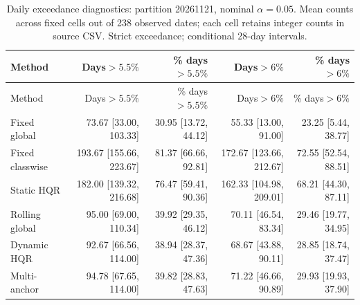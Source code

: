 \begingroup\small\setlength{\tabcolsep}{3pt}
\begin{longtable}{lrrrr}
\caption{Daily exceedance diagnostics: partition 20261121, nominal $\alpha=0.05$. Mean counts across fixed cells out of 238 observed dates; each cell retains integer counts in source CSV. Strict exceedance; conditional 28-day intervals.}\label{tab:final-risk-0-0-exceed}\\
\toprule
Method & Days$>5.5\%$ & \% days$>5.5\%$ & Days$>6\%$ & \% days$>6\%$\\
\midrule
\endfirsthead
\toprule
Method & Days$>5.5\%$ & \% days$>5.5\%$ & Days$>6\%$ & \% days$>6\%$\\
\midrule
\endhead
Fixed global & 73.67 [33.00, 103.33] & 30.95 [13.72, 44.12] & 55.33 [13.00, 91.00] & 23.25 [5.44, 38.77]\\
Fixed classwise & 193.67 [155.66, 223.67] & 81.37 [66.66, 92.81] & 172.67 [123.66, 212.67] & 72.55 [52.54, 88.51]\\
Static HQR & 182.00 [139.32, 216.68] & 76.47 [59.41, 90.36] & 162.33 [104.98, 209.01] & 68.21 [44.30, 87.11]\\
Rolling global & 95.00 [69.00, 110.34] & 39.92 [29.35, 46.12] & 70.11 [46.54, 83.34] & 29.46 [19.77, 34.95]\\
Dynamic HQR & 92.67 [66.56, 114.00] & 38.94 [28.37, 47.36] & 68.67 [43.88, 90.11] & 28.85 [18.74, 37.47]\\
Multi-anchor & 94.78 [67.65, 114.00] & 39.82 [28.83, 47.63] & 71.22 [46.66, 90.89] & 29.93 [19.93, 37.90]\\
\bottomrule
\end{longtable}
\endgroup
